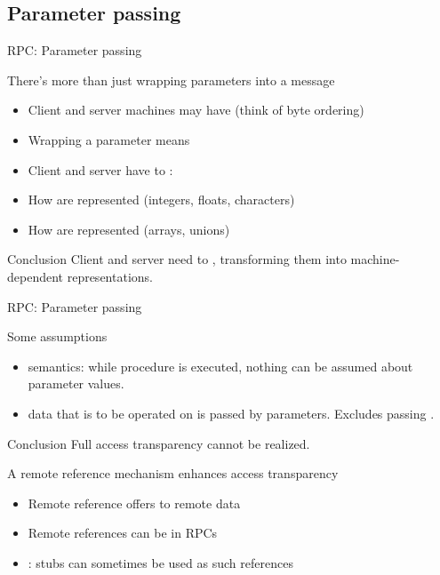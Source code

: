 \subsection{Parameter passing}
\begin{slide}{RPC: Parameter passing}
  \begin{block}{There's more than just wrapping parameters into a message}
    \begin{itemize}\tightlist
    \item Client and server machines may have  (think of byte ordering)
    \item Wrapping a parameter means 
    \item Client and server have to :
    \end{itemize}
    \begin{itemize}\tightlist
    \item How are  represented (integers, floats, characters)
    \item How are  represented (arrays, unions)
    \end{itemize}
  \end{block}
  \begin{alertblock}{Conclusion}
    Client and server need to , transforming them into machine-dependent
    representations. 
  \end{alertblock}
\end{slide}
\begin{slide}{RPC: Parameter passing}
  \begin{block}{Some assumptions}
      \begin{itemize}\tightlist
      \item {} semantics: while procedure is executed, nothing can be assumed about parameter
        values.
      \item {} data that is to be operated on is passed by parameters. Excludes passing
        .
      \end{itemize}
  \end{block}
  \onslide
  \begin{alertblock}{Conclusion} 
    Full access transparency cannot be realized.
  \end{alertblock}
  \onslide
  \begin{block}{A remote reference mechanism enhances access transparency}
    \begin{itemize}\tightlist
    \item Remote reference offers  to remote data
    \item Remote references can be  in RPCs
    \item {}: stubs can sometimes be used as such references
    \end{itemize}
  \end{block}
\end{slide}
